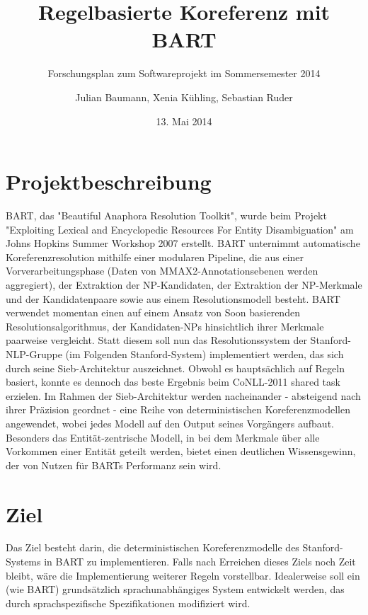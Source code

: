\documentclass{scrartcl}
\author{Julian Baumann, Xenia K\"uhling, Sebastian Ruder}
\date{13. Mai 2014}
\title{Regelbasierte Koreferenz mit BART}
\subtitle{Forschungsplan zum Softwareprojekt im Sommersemester 2014}
\begin{document}
\maketitle

\section{Projektbeschreibung}
BART, das "Beautiful Anaphora Resolution Toolkit", wurde beim Projekt "Exploiting Lexical and Encyclopedic Resources For Entity Disambiguation" am Johns Hopkins Summer Workshop 2007 erstellt. BART unternimmt automatische Koreferenzresolution mithilfe einer modularen Pipeline, die aus einer Vorverarbeitungsphase (Daten von MMAX2-Annotationsebenen werden aggregiert), der Extraktion der NP-Kandidaten, der Extraktion der NP-Merkmale und der Kandidatenpaare sowie aus einem Resolutionsmodell besteht. BART verwendet momentan einen auf einem Ansatz von Soon basierenden Resolutionsalgorithmus, der Kandidaten-NPs hinsichtlich ihrer Merkmale paarweise vergleicht. Statt diesem soll nun das Resolutionssystem der Stanford-NLP-Gruppe (im Folgenden Stanford-System) implementiert werden, das sich durch seine Sieb-Architektur auszeichnet. Obwohl es haupts\"achlich auf Regeln basiert, konnte es dennoch das beste Ergebnis beim CoNLL-2011 shared task erzielen. Im Rahmen der Sieb-Architektur werden nacheinander - absteigend nach ihrer Pr\"azision geordnet - eine Reihe von deterministischen Koreferenzmodellen angewendet, wobei jedes Modell auf den Output seines Vorg\"angers aufbaut. Besonders das Entit\"at-zentrische Modell, in bei dem Merkmale \"uber alle Vorkommen einer Entit\"at geteilt werden, bietet einen deutlichen Wissensgewinn, der von Nutzen f\"ur BARTs Performanz sein wird.





\section{Ziel} 
Das Ziel besteht darin, die deterministischen Koreferenzmodelle des Stanford-Systems in BART zu implementieren. Falls nach Erreichen dieses Ziels noch Zeit bleibt, w\"are die Implementierung weiterer Regeln vorstellbar. Idealerweise soll ein (wie BART) grunds\"atzlich sprachunabh\"angiges System entwickelt werden, das durch sprachspezifische Spezifikationen modifiziert wird. 
\end{document}
